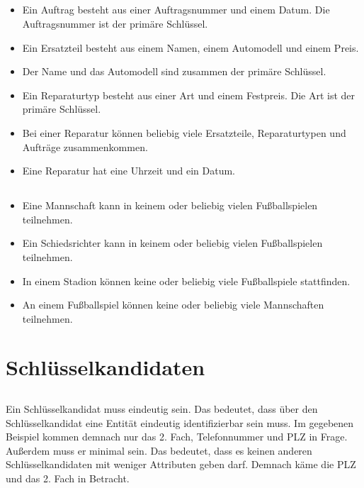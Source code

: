 \documentclass[ngerman]{gdb-aufgabenblatt}
\begin{document}
	\subsection{} %
		\begin{itemize}
			\item	Ein Auftrag besteht aus einer Auftragsnummer und einem Datum. Die Auftragsnummer ist der primäre Schlüssel.
			\item	Ein Ersatzteil besteht aus einem Namen, einem Automodell und einem Preis.
			\item	Der Name und das Automodell sind zusammen der primäre Schlüssel.
			\item	Ein Reparaturtyp besteht aus einer Art und einem Festpreis. Die Art ist der primäre Schlüssel.
			\item	Bei einer Reparatur können beliebig viele Ersatzteile, Reparaturtypen und Aufträge zusammenkommen.
			\item	Eine Reparatur hat eine Uhrzeit und ein Datum.
		\end{itemize}
	\subsection{} %
		\begin{itemize}
			\item	Eine Mannschaft kann in keinem oder beliebig vielen Fußballspielen teilnehmen.
			\item	Ein Schiedsrichter kann in keinem oder beliebig vielen Fußballspielen teilnehmen.
			\item	In einem Stadion können keine oder beliebig viele Fußballspiele stattfinden.
			\item	An einem Fußballspiel können keine oder beliebig viele Mannschaften teilnehmen.
		\end{itemize}
\section{Schlüsselkandidaten}
	\subsection{} %
		Ein Schlüsselkandidat muss eindeutig sein. Das bedeutet, dass über den Schlüsselkandidat eine Entität eindeutig identifizierbar sein muss. Im gegebenen Beispiel kommen demnach nur das 2. Fach, Telefonnummer und PLZ in Frage. Außerdem muss er minimal sein. Das bedeutet, dass es keinen anderen Schlüsselkandidaten mit weniger Attributen geben darf. Demnach käme die PLZ und das 2. Fach in Betracht.
		
\end{document}
